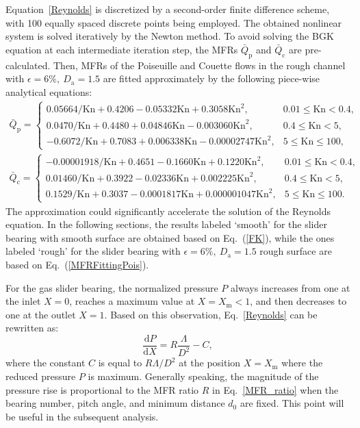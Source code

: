 Equation~\eqref{Reynolds} is discretized by a second-order finite difference scheme, with 100 equally spaced discrete points being employed. The obtained nonlinear system is solved iteratively by the Newton method. To avoid solving the BGK equation at each intermediate iteration step, the MFRs $\bar{Q}_\text{p}$ and $\bar{Q}_\text{c}$ are pre-calculated. Then, MFRs of the Poiseuille and Couette flows in the rough channel with $\epsilon=6\%,\ D_\text{a}=1.5$ are fitted approximately by the following piece-wise analytical equations:
	\begin{equation}
	\begin{split}
	\bar{Q}_\text{p}=\begin{cases}
	0.05664/\text{Kn}+0.4206-0.05332\text{Kn}+0.3058\text{Kn}^2, & 0.01\le\text{Kn}<0.4,\\
	0.0470/\text{Kn}+0.4480+0.04846\text{Kn}-0.003060\text{Kn}^2, & 0.4\le\text{Kn}<5,\\
	-0.6072/\text{Kn}+0.7083+0.006338\text{Kn}-0.00002747\text{Kn}^2, & 5\le\text{Kn}\le100,
	\end{cases}
	\label{MFRFittingPois}\\
	\bar{Q}_\text{c}=\begin{cases}
	-0.00001918/\text{Kn}+0.4651-0.1660\text{Kn}+0.1220\text{Kn}^2, & 0.01\le\text{Kn}<0.4,\\
	0.01460/\text{Kn}+0.3922-0.02336\text{Kn}+0.002225\text{Kn}^2, & 0.4\le\text{Kn}<5,\\
	0.1529/\text{Kn}+0.3037-0.0001817\text{Kn}+0.000001047\text{Kn}^2, & 5\le\text{Kn}\le100.
	\end{cases}
	\end{split}
	\end{equation}
The approximation could significantly accelerate the solution of the Reynolds equation. In the following sections, the results labeled `smooth' for the slider bearing with smooth surface are obtained based on Eq.~(\ref{FK}), while the ones labeled `rough' for the slider bearing with $\epsilon=6\%,\ D_\text{a}=1.5$ rough surface are based on Eq.~(\ref{MFRFittingPois}).



For the gas slider bearing, the normalized pressure $P$ always increases from one at the inlet $X=0$, reaches a maximum value at $X=X_\text{m}<1$, and then decreases to one at the outlet $X=1$. Based on this observation, Eq.~\eqref{Reynolds} can be rewritten as:
\begin{equation}\label{Reynolds2}
\frac{\mathrm{d}P}{\mathrm{d}X}=R\frac{\Lambda}{D^2}
-C,
\end{equation}
where the constant $C$ is equal to $R{\Lambda}/{D^2}$ at the position $X=X_\text{m}$ where the reduced pressure $P$ is maximum. Generally speaking, the magnitude of the pressure rise is proportional to the MFR ratio $R$ in Eq.~\eqref{MFR_ratio} when the bearing number, pitch angle, and minimum distance $d_0$ are fixed. This point will be useful in the subsequent analysis.


